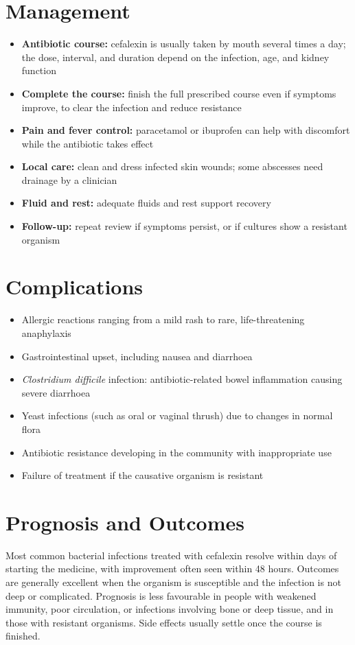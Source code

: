 \section*{Management}
\begin{itemize}
    \item \textbf{Antibiotic course:} cefalexin is usually taken by mouth several times a day; the dose, interval, and duration depend on the infection, age, and kidney function
    \item \textbf{Complete the course:} finish the full prescribed course even if symptoms improve, to clear the infection and reduce resistance
    \item \textbf{Pain and fever control:} paracetamol or ibuprofen can help with discomfort while the antibiotic takes effect
    \item \textbf{Local care:} clean and dress infected skin wounds; some abscesses need drainage by a clinician
    \item \textbf{Fluid and rest:} adequate fluids and rest support recovery
    \item \textbf{Follow-up:} repeat review if symptoms persist, or if cultures show a resistant organism
\end{itemize}

\section*{Complications}
\begin{itemize}
    \item Allergic reactions ranging from a mild rash to rare, life-threatening anaphylaxis
    \item Gastrointestinal upset, including nausea and diarrhoea
    \item \textit{Clostridium difficile} infection: antibiotic-related bowel inflammation causing severe diarrhoea
    \item Yeast infections (such as oral or vaginal thrush) due to changes in normal flora
    \item Antibiotic resistance developing in the community with inappropriate use
    \item Failure of treatment if the causative organism is resistant
\end{itemize}

\section*{Prognosis and Outcomes}
Most common bacterial infections treated with cefalexin resolve within days of starting the medicine, with improvement often seen within 48 hours. Outcomes are generally excellent when the organism is susceptible and the infection is not deep or complicated. Prognosis is less favourable in people with weakened immunity, poor circulation, or infections involving bone or deep tissue, and in those with resistant organisms. Side effects usually settle once the course is finished.

